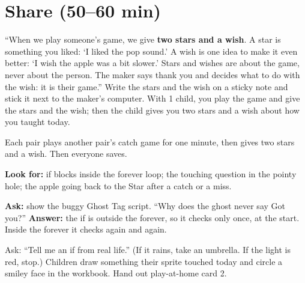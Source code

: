 \section{Share (50--60 min)}
\begin{safety}
\enquote{When we play someone's game, we give \textbf{two stars and a wish}. A star is something you liked: \enquote{I liked the pop sound.} A wish is one idea to make it even better: \enquote{I wish the apple was a bit slower.} Stars and wishes are about the game, never about the person. The maker says thank you and decides what to do with the wish: it is their game.} Write the stars and the wish on a sticky note and stick it next to the maker's computer. With 1 child, you play the game and give the stars and the wish; then the child gives you two stars and a wish about how you taught today.
\end{safety}

\begin{teacherscript}
Each pair plays another pair's catch game for one minute, then gives two stars and a wish. Then everyone saves.
\end{teacherscript}

\begin{formativecheck}
\textbf{Look for:} if blocks inside the forever loop; the touching question in the pointy hole; the apple going back to the Star after a catch or a miss.

\textbf{Ask:} show the buggy Ghost Tag script. \enquote{Why does the ghost never say Got you?}
\textbf{Answer:} the if is outside the forever, so it checks only once, at the start. Inside the forever it checks again and again.
\end{formativecheck}

\begin{reflection}
Ask: \enquote{Tell me an if from real life.} (If it rains, take an umbrella. If the light is red, stop.) Children draw something their sprite touched today and circle a smiley face in the workbook. Hand out play-at-home card 2.
\end{reflection}

